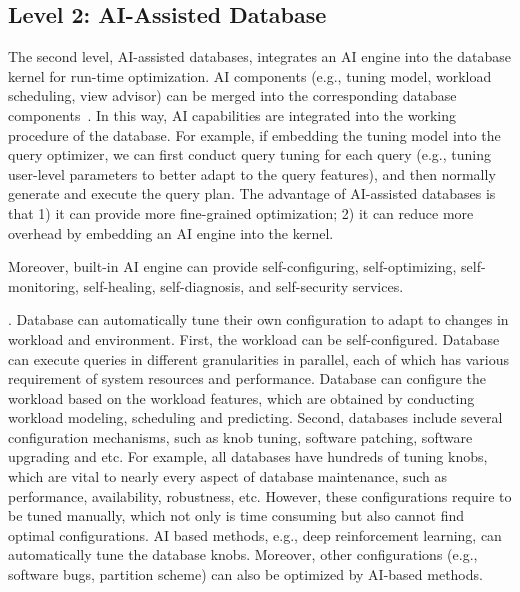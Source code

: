 \subsection{Level 2: AI-Assisted Database}
\label{subsec: assisted}

The second level, AI-assisted databases, integrates an AI engine into the database kernel for run-time optimization. AI components (e.g., tuning model, workload scheduling, view advisor) can be merged into the corresponding database components~\cite{DBLP:journals/corr/abs-1903-01363}. In this way, AI capabilities are integrated into the working procedure of the database. For example, if embedding the tuning model into the query optimizer, we can first conduct query tuning for each query (e.g., tuning user-level parameters to better adapt to the query features), and then normally generate and execute the query plan. The advantage of AI-assisted databases is that 1) it can provide more fine-grained optimization; 2) it can reduce more overhead by embedding an AI engine into the kernel. 


Moreover, built-in AI engine can provide self-configuring, self-optimizing, self-monitoring, self-healing, self-diagnosis, and self-security services. 

. Database can automatically tune their own configuration to adapt to changes in workload and environment. First, the workload can be  self-configured. Database can execute queries in different granularities in parallel, each of which has various requirement of system resources and performance. Database can configure the workload based on the workload features, which are obtained by conducting workload modeling, scheduling and predicting. Second, databases include several configuration mechanisms, such as knob tuning, software patching, software upgrading and etc. For example, all databases have hundreds of tuning knobs, which are vital to nearly every aspect of database maintenance, such as performance, availability, robustness, etc. However, these configurations require to be tuned manually, which not only is time consuming but also cannot find optimal configurations. AI based methods, e.g., deep reinforcement learning, can automatically tune the database knobs. Moreover, other configurations (e.g., software bugs, partition scheme) can also be optimized by AI-based methods. 

